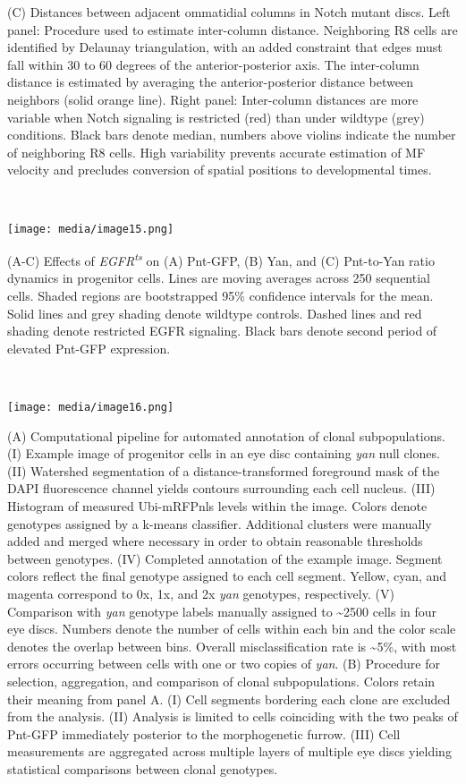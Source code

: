 (C) Distances between adjacent ommatidial columns in Notch mutant discs. Left panel: Procedure used to estimate inter-column distance. Neighboring R8 cells are identified by Delaunay triangulation, with an added constraint that edges must fall within 30 to 60 degrees of the anterior-posterior axis. The inter-column distance is estimated by averaging the anterior-posterior distance between neighbors (solid orange line). Right panel: Inter-column distances are more variable when Notch signaling is restricted (red) than under wildtype (grey) conditions. Black bars denote median, numbers above violins indicate the number of neighboring R8 cells. High variability prevents accurate estimation of MF velocity and precludes conversion of spatial positions to developmental times.

\textbf{\\
}

\texttt{[image: media/image15.png]}

(A-C) Effects of \emph{EGFR\textsuperscript{ts}} on (A) Pnt-GFP, (B) Yan, and (C) Pnt-to-Yan ratio dynamics in progenitor cells. Lines are moving averages across 250 sequential cells. Shaded regions are bootstrapped 95\% confidence intervals for the mean. Solid lines and grey shading denote wildtype controls. Dashed lines and red shading denote restricted EGFR signaling. Black bars denote second period of elevated Pnt-GFP expression.

\textbf{\\
}

\texttt{[image: media/image16.png]}

(A) Computational pipeline for automated annotation of clonal subpopulations. (I) Example image of progenitor cells in an eye disc containing \emph{yan} null clones. (II) Watershed segmentation of a distance-transformed foreground mask of the DAPI fluorescence channel yields contours surrounding each cell nucleus. (III) Histogram of measured Ubi-mRFPnls levels within the image. Colors denote genotypes assigned by a k-means classifier. Additional clusters were manually added and merged where necessary in order to obtain reasonable thresholds between genotypes. (IV) Completed annotation of the example image. Segment colors reflect the final genotype assigned to each cell segment. Yellow, cyan, and magenta correspond to 0x, 1x, and 2x \emph{yan} genotypes, respectively. (V) Comparison with \emph{yan} genotype labels manually assigned to \textasciitilde{}2500 cells in four eye discs. Numbers denote the number of cells within each bin and the color scale denotes the overlap between bins. Overall misclassification rate is \textasciitilde{}5\%, with most errors occurring between cells with one or two copies of \emph{yan}. (B) Procedure for selection, aggregation, and comparison of clonal subpopulations. Colors retain their meaning from panel A. (I) Cell segments bordering each clone are excluded from the analysis. (II) Analysis is limited to cells coinciding with the two peaks of Pnt-GFP immediately posterior to the morphogenetic furrow. (III) Cell measurements are aggregated across multiple layers of multiple eye discs yielding statistical comparisons between clonal genotypes.

